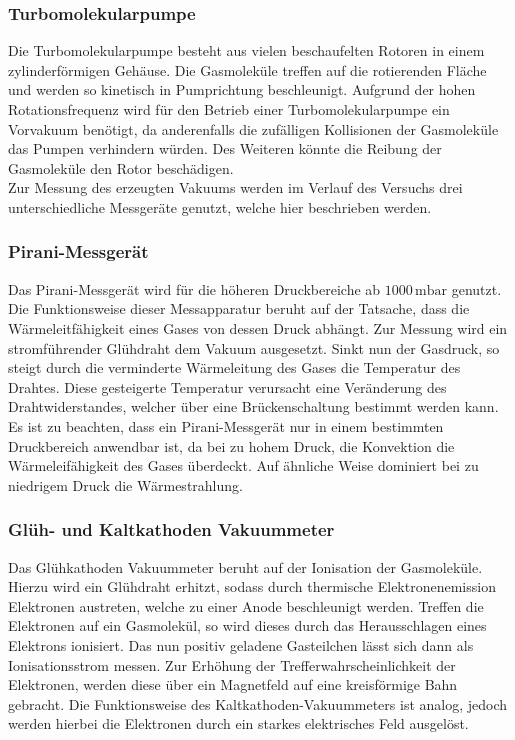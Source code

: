 \subsubsection{Turbomolekularpumpe}
Die Turbomolekularpumpe besteht aus vielen beschaufelten Rotoren in einem zylinderförmigen Gehäuse. Die Gasmoleküle treffen auf die rotierenden Fläche und werden so kinetisch in Pumprichtung beschleunigt.
Aufgrund der hohen Rotationsfrequenz wird für den Betrieb einer Turbomolekularpumpe ein Vorvakuum benötigt, da anderenfalls die zufälligen Kollisionen der Gasmoleküle das Pumpen verhindern würden. Des Weiteren
könnte die Reibung der Gasmoleküle den Rotor beschädigen.
\\Zur Messung des erzeugten Vakuums werden im Verlauf des Versuchs drei unterschiedliche Messgeräte genutzt, welche hier beschrieben werden.
\subsubsection{Pirani-Messgerät}
Das Pirani-Messgerät wird für die höheren Druckbereiche ab $1000 \,\si{\milli\bar}$ genutzt. Die Funktionsweise dieser Messapparatur beruht auf der Tatsache, dass die Wärmeleitfähigkeit eines Gases von
dessen Druck abhängt. Zur Messung wird ein stromführender Glühdraht dem Vakuum ausgesetzt. Sinkt nun der Gasdruck, so steigt durch die verminderte Wärmeleitung des Gases die Temperatur des Drahtes.
Diese gesteigerte Temperatur verursacht eine Veränderung des Drahtwiderstandes, welcher über eine Brückenschaltung bestimmt werden kann. Es ist zu beachten, dass ein Pirani-Messgerät nur in einem
bestimmten Druckbereich anwendbar ist, da bei zu hohem Druck, die Konvektion die Wärmeleifähigkeit des Gases überdeckt. Auf ähnliche Weise dominiert bei zu niedrigem Druck die Wärmestrahlung.
\subsubsection{Glüh- und Kaltkathoden Vakuummeter}
Das Glühkathoden Vakuummeter beruht auf der Ionisation der Gasmoleküle. Hierzu wird ein Glühdraht erhitzt, sodass durch thermische Elektronenemission Elektronen austreten, welche zu einer Anode
beschleunigt werden. Treffen die Elektronen auf ein Gasmolekül, so wird dieses durch das Herausschlagen eines Elektrons ionisiert. Das nun positiv geladene Gasteilchen lässt sich dann als
Ionisationsstrom messen. Zur Erhöhung der Trefferwahrscheinlichkeit der Elektronen, werden diese über ein Magnetfeld auf eine kreisförmige Bahn gebracht. Die Funktionsweise des Kaltkathoden-Vakuummeters
ist analog, jedoch werden hierbei die Elektronen durch ein starkes elektrisches Feld ausgelöst.
